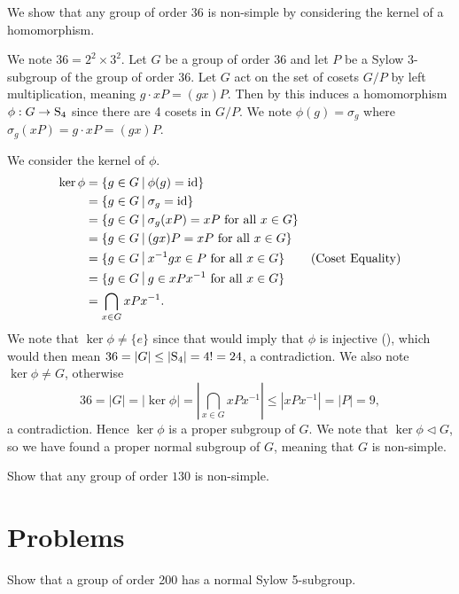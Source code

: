 \begin{example}\label{example-using-kernel-to-show-non-simple}
    We show that any group of order 36 is non-simple by considering the kernel of a homomorphism.

    We note $36 = 2^2 \times 3^2$. Let $G$ be a group of order 36 and let $P$ be a Sylow 3-subgroup of the group of order 36. Let $G$ act on the set of cosets $G/P$ by left multiplication, meaning $g \cdot xP = (gx)P$. Then by  this induces a homomorphism $\phi: G \to \mathrm{S}_{4}$ since there are 4 cosets in $G/P$. We note $\phi(g) = \sigma_g$ where $\sigma_g(xP) = g\cdot xP = (gx)P$.

    We consider the kernel of $\phi$.
    \begin{align*}
        \ker\phi &= \{g \in G \vert \phi(g) = \id\}\\
        &= \{g \in G \vert \sigma_g = \id\}\\
        &= \{g \in G \vert \sigma_g(xP) = xP \text{ for all } x \in G\}\\
        &= \{g \in G \vert (gx)P = xP \text{ for all } x \in G\}\\
        &= \{g \in G \vert x^{-1}gx \in P \text{ for all } x \in G\} & (\text{Coset Equality})\\
        &= \{g \in G \vert g \in xPx^{-1} \text{ for all } x \in G\}\\
        &= \bigcap_{x \in G} xPx^{-1}.
    \end{align*}
    We note that $\ker\phi \neq \{e\}$ since that would imply that $\phi$ is injective (), which would then mean $36 = |G| \leq |\mathrm{S}_{4}| = 4! = 24$, a contradiction. We also note $\ker\phi \neq G$, otherwise
    \[
        36 = |G| = |\ker\phi| = \left|\bigcap_{x \in G} xPx^{-1}\right| \leq |xPx^{-1}| = |P| = 9,
    \]
    a contradiction. Hence $\ker\phi$ is a proper subgroup of $G$. We note that $\ker\phi \lhd G$, so we have found a proper normal subgroup of $G$, meaning that $G$ is non-simple.
\end{example}

\begin{exercise}
    Show that any group of order $130$ is non-simple.
\end{exercise}

\newpage

\section{Problems}
\begin{problem}
    Show that a group of order 200 has a normal Sylow 5-subgroup.
\end{problem}

